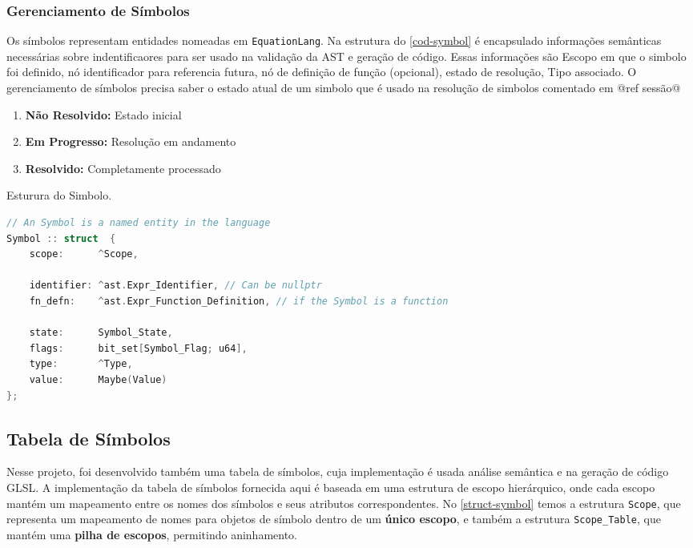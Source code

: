 \subsubsection{Gerenciamento de Símbolos}

Os símbolos representam entidades nomeadas em \texttt{EquationLang}. Na estrutura do \autoref{cod-symbol} é encapsulado informações semânticas necessárias sobre indentificaores para ser usado na validação da AST e geração de código. Essas informações são Escopo em que o simbolo foi definido, nó identificador para referencia futura, nó de definição de função (opcional), estado de resolução, Tipo associado. O gerenciamento de símbolos precisa saber o estado atual de um simbolo que é usado na resolução de simbolos comentado em @ref sessão@

\begin{enumerate}
    \item \textbf{Não Resolvido:} Estado inicial
    \item \textbf{Em Progresso:} Resolução em andamento
    \item \textbf{Resolvido:} Completamente processado
\end{enumerate}

\begin{codigo}[htb]
    \caption{\small Esturura do Simbolo. }
    \label{cod-symbol}
\begin{lstlisting}[language=C, numbers=none, frame=none, inputencoding=latin1]
// An Symbol is a named entity in the language
Symbol :: struct  {
    scope:      ^Scope,

    identifier: ^ast.Expr_Identifier, // Can be nullptr
    fn_defn:    ^ast.Expr_Function_Definition, // if the Symbol is a function

    state:      Symbol_State,
    flags:      bit_set[Symbol_Flag; u64],
    type:       ^Type,
    value:      Maybe(Value)
};

\end{lstlisting}
\end{codigo}


\subsection{Tabela de Símbolos}

Nesse projeto, foi desenvolvido também uma tabela de símbolos, cuja implementação é usada análise semântica e na geração de código GLSL. A implementação da tabela de símbolos fornecida aqui é baseada em uma estrutura de escopo hierárquico, onde cada escopo mantém um mapeamento entre os nomes dos símbolos e seus atributos correspondentes. No \autoref{struct-symbol} temos a estrutura \texttt{Scope}, que representa um mapeamento de nomes para objetos de símbolo dentro de um \textbf{único escopo}, e também a estrutura \texttt{Scope\_Table}, que mantém uma \textbf{pilha de escopos}, permitindo aninhamento.


